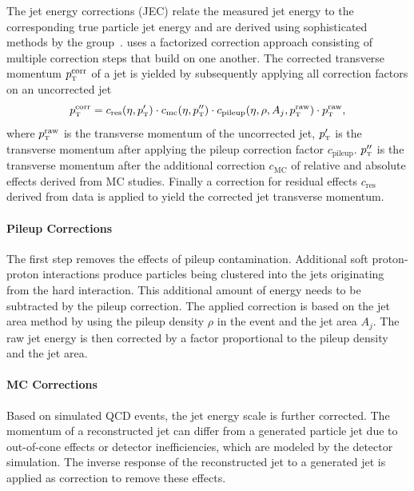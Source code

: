 The jet energy corrections (JEC) relate the measured jet energy to the
corresponding true particle jet energy and are derived using sophisticated
methods by the \JetMET group~\cite{Chatrchyan:2011ds,jec_8tev}. \CMS uses a factorized
correction approach consisting of multiple correction steps that build on one
another. The corrected transverse momentum $\pt^{\mathrm{corr}}$ of a jet is
yielded by subsequently applying all correction factors on an uncorrected jet
%
\begin{equation*}
    \pt^{\mathrm{corr}} = c_{\mathrm{res}} (\eta, \pt^{\prime}) \cdot c_{\mathrm{mc}}
    (\eta, \pt^{\prime\prime}) \cdot c_{\mathrm{pileup}}(\eta, \rho, A_j,
    \pt^{\mathrm{raw}}) \cdot \pt^{\mathrm{raw}},
\end{equation*}
%
where $\pt^{\mathrm{raw}}$ is the transverse momentum of the uncorrected jet,
$\pt^{\prime}$ is the transverse momentum after applying the pileup correction
factor $c_{\mathrm{pileup}}$. $\pt^{\prime\prime}$ is the transverse momentum
after the additional correction $c_\mathrm{MC}$ of relative and absolute effects
derived from MC studies. Finally a correction for residual effects
$c_{\mathrm{res}}$ derived from data is applied to yield the corrected jet
transverse momentum.

\paragraph{Pileup Corrections}
\label{pileup_correction}

The first step removes the effects of pileup contamination. Additional soft
proton-proton interactions produce particles being clustered into the jets
originating from the hard interaction. This additional amount of energy needs to
be subtracted by the pileup correction. The applied correction is based on the
jet area method by using the pileup density $\rho$ in the event and the jet
area $A_j$. The raw jet energy is then corrected by a factor proportional to the
pileup density and the jet area.

\paragraph{MC Corrections}

Based on simulated QCD events, the jet energy scale is further corrected. The
momentum of a reconstructed jet can differ from a generated particle jet due to
out-of-cone effects or detector inefficiencies, which are modeled by the detector
simulation. The inverse response of the reconstructed jet to a generated jet is
applied as correction to remove these effects.

